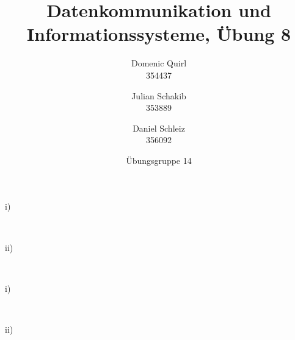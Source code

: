 \documentclass{../exercisesheet}
\title{Datenkommunikation und Informationssysteme, Übung 8}
\author{
    Domenic Quirl \\ 354437
    \and
    Julian Schakib \\ 353889
    \and 
    Daniel Schleiz \\ 356092
}
\date{Übungsgruppe 14}
\begin{document}
\maketitle
\pointtable


\begin{exercise}{6}
\begin{subexercise}

\end{subexercise}
\begin{subexercise}
\begin{description}
\item[i)] \ \\

\item[ii)] \ \\

\end{description}
\end{subexercise}
\begin{subexercise}

\end{subexercise}
\end{exercise}


\begin{exercise}{4}
\begin{subexercise}
\begin{description}
\item[i)] \ \\

\item[ii)] \ \\

\end{description}
\end{subexercise}
\begin{subexercise}

\end{subexercise}
\end{exercise}


\begin{exercise}{5}
\begin{subexercise}

\end{subexercise}
\begin{subexercise}

\end{subexercise}
\end{exercise}
\end{document}
